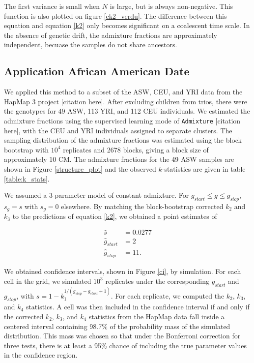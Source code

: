 \documentclass[11pt]{amsart}
\begin{document}
The first variance is small when $N$ is large, but is always non-negative.  This function is also plotted on figure \ref{ek2_verdu}. The difference between this equation and equation \ref{k2} only becomes significant on a coalescent time scale. In the absence of genetic drift, the admixture fractions are approximately independent, becuase the samples do not share ancestors.

\subsection*{Application African American Date}
We applied this method to a subset of the ASW, CEU, and YRI data from the HapMap 3 project [citation here].
After excluding children from trios, there were the genotypes for 49 ASW, 113 YRI, and 112 CEU individuals. 
We estimated the admixture fractions using the supervised learning mode of \verb|Admixture| [citation here], with the CEU and YRI individuals assigned to separate clusters. 
The sampling distribution of the admixture fractions was estimated using the block bootstrap with $10^4$ replicates and 2678 blocks, giving a block size of approximately 10 CM.
The admixture fractions for the 49 ASW samples are shown in Figure \ref{structure_plot} and the observed $k$-statistics are given in table \ref{table:k_stats}. 

We assumed a 3-parameter model of constant admixture. For $g_{start}\leq g\leq g_{stop}$, $s_g=s$ with $s_g=0$ elsewhere. By matching the block-bootstrap corrected $k_2$ and $k_3$ to the predictions of equation \ref{k2}, we obtained a point estimates of 

\begin{align*}
 \hat{s} &= 0.0277\\
 \hat{g}_{start} &= 2 \\
 \hat{g}_{stop} &= 11.
\end{align*}

We obtained confidence intervals, shown in Figure \ref{ci}, by simulation. For each cell in the grid, we simulated $10^3$ replicates under the corresponding $g_{start}$ and $g_{stop}$, with $s=1-k_1^{1/(g_{stop}-g_{start}+1)}$. For each replicate, we computed the $k_2$, $k_3$, and $k_4$ statistics. A cell was then included in the confidence interval if and only if the corrected $k_2$, $k_3$, and $k_4$ statistics from the HapMap data fall inside a centered interval containing 98.7\% of the probability mass of the simulated distribution. This mass was chosen so that under the Bonferroni correction for three tests, there is at least a 95\% chance of including the true parameter values in the confidence region.
\end{document}
